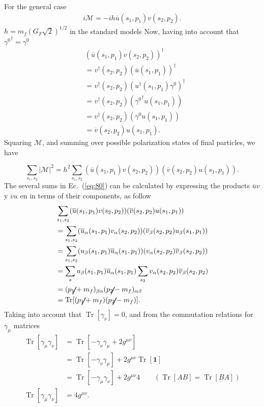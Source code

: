 For the general case
\begin{align}
i\mathcal{M}=-i h\overline{u}(s_1,p_{1})v(s_2, p_{2}). 
\end{align}
$h=m_{f}\left(G_{F}\sqrt{2}\right)^{1/2}$ in the standard models
Now, having into account that ${\gamma^{0}}^{\dag}=\gamma^{0}$
\begin{align*}
&(\overline{u}(s_1,p_{1})v(s_2, p_{2}))^{\dag}\\
&=v^{\dag}(s_2, p_{2})(\overline{u}(s_1,p_{1}))^{\dag}\\
&=v^{\dag}(s_2, p_{2})({u^{\dag}}(s_1,p_{1}){\gamma^{0}})^{\dag}\\
&=v^{\dag}(s_2, p_{2})({\gamma^{0}}^{\dag}u(s_1,p_{1}))\\
&=v^{\dag}(s_2, p_{2})(\gamma^{0}u(s_1,p_{1}))\\
&=\overline{v}(s_2,p_{2})u(s_1,p_{1}). 
\end{align*}
Squaring  $\mathcal{M}$,  and summing over possible polarization states of final particles, we have

\begin{equation}
\sum_{s_1,s_2}|\mathcal{M}|^{2}=h^2\sum_{s_1,s_2}(\overline{u}(s_1,p_{1})v(s_2,
p_{2}))(\overline{v}(s_2,p_{2})u(s_1,p_{1})). \label{eq:80}
\end{equation}
The several sums in Ec.~(\ref{eq:80}) can be calculated by expressing the products  $\overline{u}v$ y $\overline{v}u$ en in terms of their components, as follow
\begin{align}
\label{eq:81f}
&\sum_{s_1,s_2}(\overline{u}(s_1,p_{1})v(s_2, p_{2}))(\overline{v}(s_2,p_{2})u(s_1,p_{1}))\nonumber\\
&=\sum_{s_1,s_2}(\overline{u}_{\alpha}(s_1,p_{1})v_{\alpha}(s_2, p_{2}))(\overline{v}_{\beta}(s_2,p_{2})u_{\beta}(s_1,p_{1}))\nonumber\\
&=\sum_{s_1,s_2}(u_{\beta}(s_1,p_{1})\overline{u}_{\alpha}(s_1,p_{1}))(v_{\alpha}(s_2, p_{2})\overline{v}_{\beta}(s_2,p_{2}))\nonumber\\
&=\sum_{s}u_{\beta}(s_1,p_{1})\overline{u}_{\alpha}(s_1,p_{1})\sum_{s_2}v_{\alpha}(s_2, p_{2})\overline{v}_{\beta}(s_2,p_{2})\nonumber\\
&=(\cancel{p}_{1}+m_{f})_{\beta\alpha}(\cancel{p}_{2}-m_{f})_{\alpha\beta}\nonumber\\
&=\operatorname{Tr}[(\cancel{p}_{1}+m_{f})(\cancel{p}_{2}-m_{f})]. 
\end{align}
Taking into account that  $\operatorname{Tr}[\gamma_{\nu}]=0$, and from the commutation relations for $\gamma_\mu$ matrices
\begin{align*}
\operatorname{Tr}[\gamma_{\mu}\gamma_{\nu}]&=\operatorname{Tr}[-\gamma_{\nu}\gamma_{\mu}+2g^{\mu\nu}]\\
&=\operatorname{Tr}[-\gamma_{\nu}\gamma_{\mu}]+2g^{\mu\nu}\operatorname{Tr}[\mathbf{1}]\\
&=\operatorname{Tr}[-\gamma_{\mu}\gamma_{\nu}]+2g^{\mu\nu}4 \qquad (\operatorname{Tr}[AB]=\operatorname{Tr}[BA])\\
\operatorname{Tr}[\gamma_{\mu}\gamma_{\nu}]&=4g^{\mu\nu}.
\end{align*}

